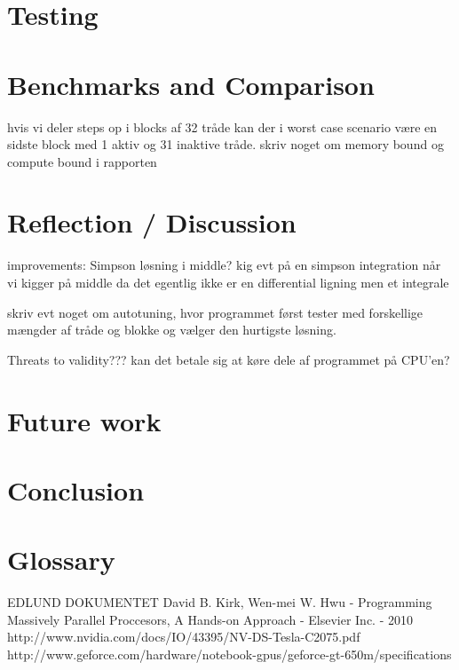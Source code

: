 \documentclass[oribibl]{llncs}
\begin{document}
	\section{Testing}
		
	
	\label{testing}
		
	\section{Benchmarks and Comparison}
		hvis vi deler steps op i blocks af 32 tråde kan der i worst case scenario være en sidste block med 1 aktiv og 31 inaktive tråde.
		skriv noget om memory bound og compute bound i rapporten
	
	\label{bandc}
	
	\section{Reflection / Discussion}
	improvements:
	Simpson løsning i middle?
	kig evt på en simpson integration når vi kigger på middle da det egentlig ikke er en differential ligning men et integrale
		
		skriv evt noget om autotuning, hvor programmet først tester med forskellige mængder af tråde og blokke og vælger den hurtigste løsning.
		
		Threats to validity???
		kan det betale sig at køre dele af programmet på CPU'en?
		
	
	\label{reflection}
		
	\section{Future work}
	
	
	\label{futurework}
	
	\section{Conclusion}
	
	
	\label{conclusion}
		
	\section{Glossary}
	
	
		
	\begin{thebibliography}{9}
			 EDLUND DOKUMENTET
			 David B. Kirk, Wen-mei W. Hwu - Programming Massively Parallel Proccesors, A Hands-on Approach - Elsevier Inc. - 2010
			 http://www.nvidia.com/docs/IO/43395/NV-DS-Tesla-C2075.pdf
			 http://www.geforce.com/hardware/notebook-gpus/geforce-gt-650m/specifications
	\end{thebibliography}
	
\end{document}
